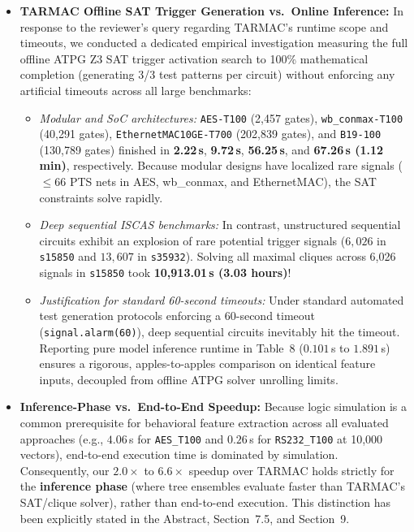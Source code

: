 \documentclass[11pt,a4paper]{article}
\begin{document}
\begin{itemize}[leftmargin=*]
    \item \textbf{TARMAC Offline SAT Trigger Generation vs.\ Online Inference:}
    In response to the reviewer's query regarding TARMAC's runtime scope and timeouts, we conducted a dedicated empirical investigation measuring the full offline ATPG Z3 SAT trigger activation search to 100\% mathematical completion (generating 3/3 test patterns per circuit) without enforcing any artificial timeouts across all large benchmarks:
    \begin{itemize}
        \item \textit{Modular and SoC architectures:} \texttt{AES-T100} (2,457 gates), \texttt{wb\_conmax-T100} (40,291 gates), \texttt{EthernetMAC10GE-T700} (202,839 gates), and \texttt{B19-100} (130,789 gates) finished in \textbf{2.22\,s}, \textbf{9.72\,s}, \textbf{56.25\,s}, and \textbf{67.26\,s (1.12\,min)}, respectively. Because modular designs have localized rare signals ($\le 66$ PTS nets in AES, wb\_conmax, and EthernetMAC), the SAT constraints solve rapidly.
        \item \textit{Deep sequential ISCAS benchmarks:} In contrast, unstructured sequential circuits exhibit an explosion of rare potential trigger signals ($6{,}026$ in \texttt{s15850} and $13{,}607$ in \texttt{s35932}). Solving all maximal cliques across 6,026 signals in \texttt{s15850} took \textbf{10,913.01\,s (3.03 hours)}!
        \item \textit{Justification for standard 60-second timeouts:} Under standard automated test generation protocols enforcing a 60-second timeout (\texttt{signal.alarm(60)}), deep sequential circuits inevitably hit the timeout. Reporting pure model inference runtime in Table~8 ($0.101$\,s to $1.891$\,s) ensures a rigorous, apples-to-apples comparison on identical feature inputs, decoupled from offline ATPG solver unrolling limits.
    \end{itemize}

    \item \textbf{Inference-Phase vs.\ End-to-End Speedup:}
    Because logic simulation is a common prerequisite for behavioral feature extraction across all evaluated approaches (e.g., $4.06$\,s for \texttt{AES\_T100} and $0.26$\,s for \texttt{RS232\_T100} at 10,000 vectors), end-to-end execution time is dominated by simulation. Consequently, our $2.0\times$ to $6.6\times$ speedup over TARMAC holds strictly for the \textbf{inference phase} (where tree ensembles evaluate faster than TARMAC's SAT/clique solver), rather than end-to-end execution. This distinction has been explicitly stated in the Abstract, Section~7.5, and Section~9.


\end{itemize}
\end{document}

